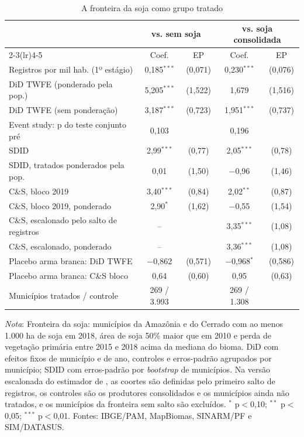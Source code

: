 \documentclass[11pt,a4paper]{article}
\newcommand{\nota}[1]{\par\vspace{2pt}\begin{minipage}{\linewidth}\footnotesize\textit{Nota}: #1\end{minipage}}
\begin{document}
\begin{table}[H]
\centering\footnotesize\setlength{\tabcolsep}{4pt}
\caption{A fronteira da soja como grupo tratado}\label{tab:soja}
\begin{tabular}{lcccc}
\toprule
 & \multicolumn{2}{c}{vs. sem soja} & \multicolumn{2}{c}{vs. soja consolidada} \\
\cmidrule(lr){2-3}\cmidrule(lr){4-5}
 & Coef. & EP & Coef. & EP \\
\midrule
Registros por mil hab. (1º estágio) & 0{,}185$^{***}$ & (0{,}071) & 0{,}230$^{***}$ & (0{,}076) \\
DiD TWFE (ponderado pela pop.) & 5{,}205$^{***}$ & (1{,}522) & 1{,}679 & (1{,}516) \\
DiD TWFE (sem ponderação) & 3{,}187$^{***}$ & (0{,}723) & 1{,}951$^{***}$ & (0{,}737) \\
Event study: p do teste conjunto pré & 0{,}103 &  & 0{,}196 &  \\
SDID & 2{,}99$^{***}$ & (0{,}77) & 2{,}05$^{***}$ & (0{,}78) \\
SDID, tratados ponderados pela pop. & 0{,}01 & (1{,}50) & $-$0{,}96 & (1{,}46) \\
C\&S, bloco 2019 & 3{,}40$^{***}$ & (0{,}84) & 2{,}02$^{**}$ & (0{,}87) \\
C\&S, bloco 2019, ponderado & 2{,}90$^{*}$ & (1{,}62) & $-$0{,}55 & (1{,}54) \\
C\&S, escalonado pelo salto de registros & -- &  & 3{,}35$^{***}$ & (1{,}08) \\
C\&S, escalonado, ponderado & -- &  & 3{,}36$^{***}$ & (1{,}08) \\
\midrule
Placebo arma branca: DiD TWFE & $-$0{,}862 & (0{,}571) & $-$0{,}968$^{*}$ & (0{,}586) \\
Placebo arma branca: C\&S bloco & 0{,}64 & (0{,}60) & 0{,}95 & (0{,}63) \\
\midrule
Municípios tratados / controle & 269 / 3.993 &  & 269 / 1.308 &  \\
\bottomrule
\end{tabular}
\nota{Fronteira da soja: municípios da Amazônia e do Cerrado com ao menos 1.000 ha de soja em 2018, área de soja 50\% maior que em 2010 e perda de vegetação primária entre 2015 e 2018 acima da mediana do bioma. DiD com efeitos fixos de município e de ano, controles e erros-padrão agrupados por município; SDID com erros-padrão por \textit{bootstrap} de municípios. Na versão escalonada do estimador de \citet{callaway2021}, as coortes são definidas pelo primeiro salto de registros, os controles são os produtores consolidados e os municípios ainda não tratados, e os municípios da fronteira sem salto são excluídos. $^{*}$ p$<$0,10; $^{**}$ p$<$0,05; $^{***}$ p$<$0,01. Fontes: IBGE/PAM, MapBiomas, SINARM/PF e SIM/DATASUS.}
\end{table}
\end{document}
